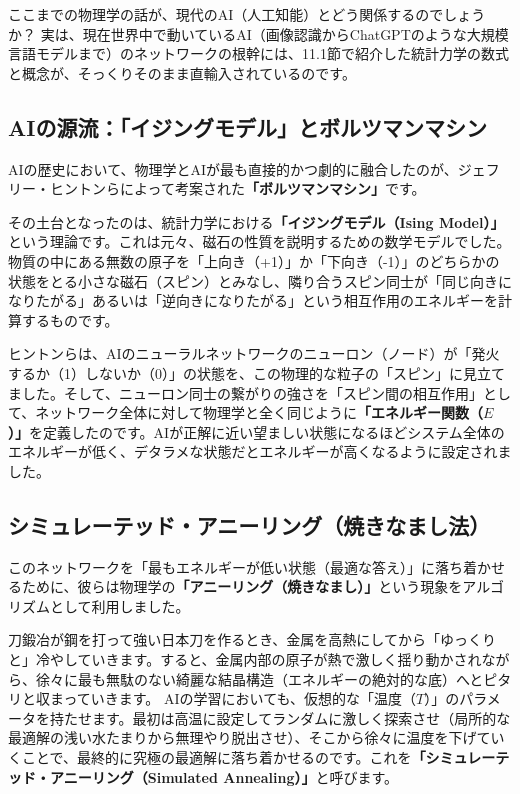 ここまでの物理学の話が、現代のAI（人工知能）とどう関係するのでしょうか？ 実は、現在世界中で動いているAI（画像認識からChatGPTのような大規模言語モデルまで）のネットワークの根幹には、11.1節で紹介した統計力学の数式と概念が、そっくりそのまま直輸入されているのです。

\subsection{AIの源流：「イジングモデル」とボルツマンマシン}

AIの歴史において、物理学とAIが最も直接的かつ劇的に融合したのが、ジェフリー・ヒントンらによって考案された\textbf{「ボルツマンマシン」}です。

その土台となったのは、統計力学における\textbf{「イジングモデル（Ising Model）」}という理論です。これは元々、磁石の性質を説明するための数学モデルでした。物質の中にある無数の原子を「上向き（+1）」か「下向き（-1）」のどちらかの状態をとる小さな磁石（スピン）とみなし、隣り合うスピン同士が「同じ向きになりたがる」あるいは「逆向きになりたがる」という相互作用のエネルギーを計算するものです。

ヒントンらは、AIのニューラルネットワークのニューロン（ノード）が「発火するか（1）しないか（0）」の状態を、この物理的な粒子の「スピン」に見立てました。そして、ニューロン同士の繋がりの強さを「スピン間の相互作用」として、ネットワーク全体に対して物理学と全く同じように\textbf{「エネルギー関数（\(E\)）」}を定義したのです。AIが正解に近い望ましい状態になるほどシステム全体のエネルギーが低く、デタラメな状態だとエネルギーが高くなるように設定されました。

\subsection{シミュレーテッド・アニーリング（焼きなまし法）}

このネットワークを「最もエネルギーが低い状態（最適な答え）」に落ち着かせるために、彼らは物理学の\textbf{「アニーリング（焼きなまし）」}という現象をアルゴリズムとして利用しました。

刀鍛冶が鋼を打って強い日本刀を作るとき、金属を高熱にしてから「ゆっくりと」冷やしていきます。すると、金属内部の原子が熱で激しく揺り動かされながら、徐々に最も無駄のない綺麗な結晶構造（エネルギーの絶対的な底）へとピタリと収まっていきます。 AIの学習においても、仮想的な「温度（\(T\)）」のパラメータを持たせます。最初は高温に設定してランダムに激しく探索させ（局所的な最適解の浅い水たまりから無理やり脱出させ）、そこから徐々に温度を下げていくことで、最終的に究極の最適解に落ち着かせるのです。これを\textbf{「シミュレーテッド・アニーリング（Simulated Annealing）」}と呼びます。

